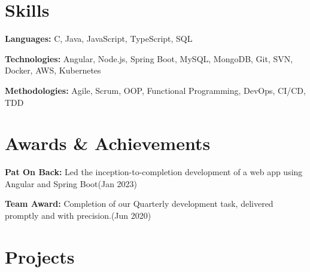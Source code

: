\documentclass{resume}
\begin{document}
\section{Skills}
  \resumeSubHeadingListStart
    \small{\item{
        
        \textbf{Languages:}{ C, Java, JavaScript, TypeScript, SQL} \\ \vspace{3pt}
        
        \textbf{Technologies:}{ Angular, Node.js, Spring Boot, MySQL, MongoDB, Git, SVN, Docker, AWS, Kubernetes} \\ \vspace{3pt}
        
        \textbf{Methodologies:}{ Agile, Scrum, OOP, Functional Programming, DevOps, CI/CD, TDD} \\ \vspace{3pt}
        
    }}
  \resumeSubHeadingListEnd


\section{Awards \& Achievements}
  \resumeSubHeadingListStart
    \small{\item{
        \textbf{Pat On Back:}{ Led the inception-to-completion development of a web app using Angular and Spring Boot(Jan 2023)} \\ \vspace{3pt}

        \textbf{Team Award:}{ Completion of our Quarterly development task, delivered promptly and with precision.(Jun 2020)} \\ \vspace{3pt}
        
    }}
  \resumeSubHeadingListEnd




\section{Projects}
    \vspace{3pt}
    \resumeSubHeadingListStart
      
\end{document}
